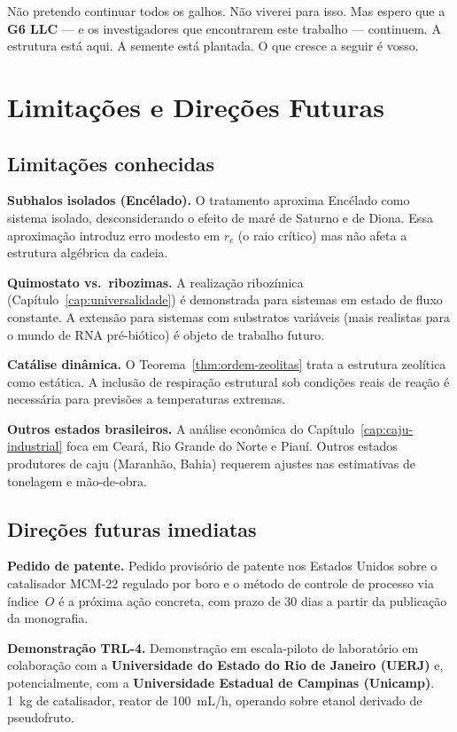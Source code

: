 \documentclass[12pt,a4paper,twoside]{book}
\theoremstyle{plain}
\theoremstyle{definition}
\theoremstyle{definition}
\begin{document}
Não pretendo continuar todos os galhos. Não viverei para isso. Mas espero
que a \textbf{G6 LLC} --- e os investigadores que encontrarem este trabalho
--- continuem. A estrutura está aqui. A semente está plantada. O que cresce
a seguir é vosso.

\chapter{Limitações e Direções Futuras}
\label{cap:limitacoes}

\section{Limitações conhecidas}

\textbf{Subhalos isolados (Encélado).} O tratamento aproxima Encélado
como sistema isolado, desconsiderando o efeito de maré de Saturno e
de Diona. Essa aproximação introduz erro modesto em $r_{c}$ (o raio
crítico) mas não afeta a estrutura algébrica da cadeia.

\textbf{Quimostato vs.\ ribozimas.} A realização ribozímica
(Capítulo~\ref{cap:universalidade}) é demonstrada para sistemas em
estado de fluxo constante. A extensão para sistemas com substratos
variáveis (mais realistas para o mundo de RNA pré-biótico) é objeto
de trabalho futuro.

\textbf{Catálise dinâmica.} O Teorema~\ref{thm:ordem-zeolitas} trata a
estrutura zeolítica como estática. A inclusão de respiração estrutural
sob condições reais de reação é necessária para previsões a temperaturas
extremas.

\textbf{Outros estados brasileiros.} A análise econômica do
Capítulo~\ref{cap:caju-industrial} foca em Ceará, Rio Grande do Norte
e Piauí. Outros estados produtores de caju (Maranhão, Bahia) requerem
ajustes nas estimativas de tonelagem e mão-de-obra.

\section{Direções futuras imediatas}

\textbf{Pedido de patente.} Pedido provisório de patente nos Estados Unidos
sobre o catalisador MCM-22 regulado por boro e o método de controle de
processo via índice~$O$ é a próxima ação concreta, com prazo de 30 dias
a partir da publicação da monografia.

\textbf{Demonstração TRL-4.} Demonstração em escala-piloto de laboratório
em colaboração com a \textbf{Universidade do Estado do Rio de Janeiro (UERJ)}
e, potencialmente, com a \textbf{Universidade Estadual de Campinas (Unicamp)}.
1~kg de catalisador,
reator de 100~mL/h, operando sobre etanol derivado de pseudofruto.
\end{document}
